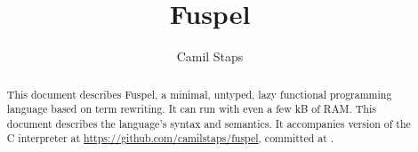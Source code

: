\documentclass[a4paper]{article}
\author{Camil Staps}
\title{Fuspel}
\date{\gitcommitdate[formatDate]}
\begin{document}
\maketitle

\begin{abstract}
	This document describes Fuspel,
	a minimal, untyped, lazy functional programming language
	based on term rewriting.
	It can run with even a few kB of RAM.
	This document describes the language's syntax and semantics.
	It accompanies version \gitcommithash{} of the C interpreter at
	\url{https://github.com/camilstaps/fuspel}, committed at
	.
\end{abstract}

\tableofcontents



\appendix


\end{document}
